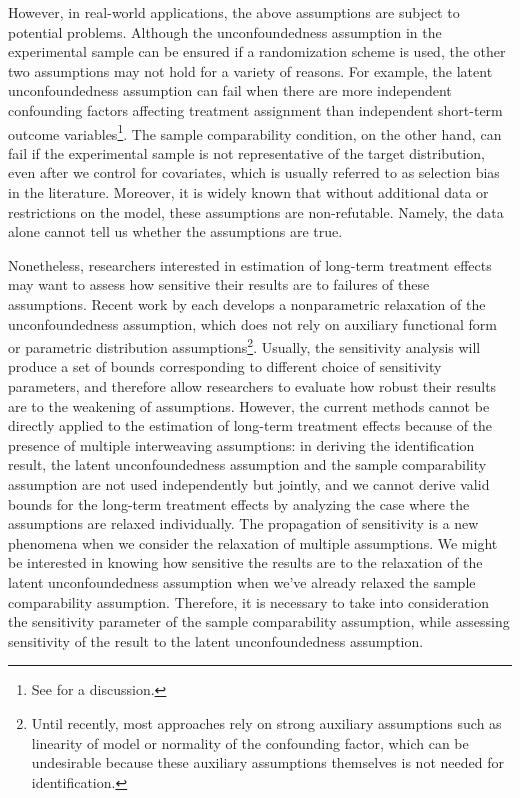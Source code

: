 \documentclass[12pt]{article}
\begin{document}
	However, in real-world applications, the above assumptions are subject to potential problems. Although the unconfoundedness assumption in the experimental sample can be ensured if a randomization scheme is used, the other two assumptions may not hold for a variety of reasons. For example, the latent unconfoundedness assumption can fail when there are more independent confounding factors affecting treatment assignment than independent short-term outcome variables\footnote{See \textcite{athey2020combining} for a discussion.}. The sample comparability condition, on the other hand, can fail if the experimental sample is not representative of the target distribution, even after we control for covariates, which is usually referred to as selection bias in the literature. Moreover, it is widely known that without additional data or restrictions on the model, these assumptions are non-refutable. Namely, the data alone cannot tell us whether the assumptions are true. 
	
	Nonetheless, researchers interested in estimation of long-term treatment effects may want to assess how sensitive their results are to failures of these assumptions. Recent work by \textcite{masten2018identification, yadlowsky2018bounds, kallus2018confounding} each develops a nonparametric relaxation of the unconfoundedness assumption, which does not rely on auxiliary functional form or parametric distribution assumptions\footnote{Until recently, most approaches rely on strong auxiliary assumptions such as linearity of model or normality of the confounding factor, which can be undesirable because these auxiliary assumptions themselves is not needed for identification. }. Usually, the sensitivity analysis will produce a set of bounds corresponding to different choice of sensitivity parameters, and therefore allow researchers to evaluate how robust their results are to the weakening of assumptions. However, the current methods cannot be directly applied to the estimation of long-term treatment effects because of the presence of multiple interweaving assumptions: in deriving the identification result, the latent unconfoundedness assumption and the sample comparability assumption are not used independently but jointly, and we cannot derive valid bounds for the long-term treatment effects by analyzing the case where the assumptions are relaxed individually. The propagation of sensitivity is a new phenomena when we consider the relaxation of multiple assumptions. We might be interested in knowing how sensitive the results are to the relaxation of the latent unconfoundedness assumption when we've already relaxed the sample comparability assumption. Therefore, it is necessary to take into consideration the sensitivity parameter of the sample comparability assumption, while assessing sensitivity of the result to the latent unconfoundedness assumption. 
    
\end{document}
